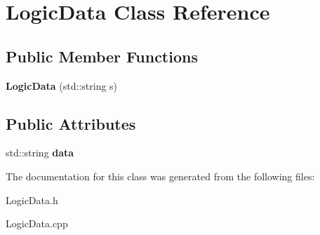 \hypertarget{class_logic_data}{}\section{Logic\+Data Class Reference}
\label{class_logic_data}
\subsection*{Public Member Functions}
\begin{DoxyCompactItemize}
\item 
\mbox{\label{class_logic_data_a182f7a8ffcbb3401e55e2922753c17bb}} 
{\bfseries Logic\+Data} (std\+::string s)
\end{DoxyCompactItemize}
\subsection*{Public Attributes}
\begin{DoxyCompactItemize}
\item 
\mbox{\label{class_logic_data_a59c1bf0acf3ec2ea31d3bbf814740f2e}} 
std\+::string {\bfseries data}
\end{DoxyCompactItemize}


The documentation for this class was generated from the following files\+:\begin{DoxyCompactItemize}
\item 
Logic\+Data.\+h\item 
Logic\+Data.\+cpp\end{DoxyCompactItemize}
